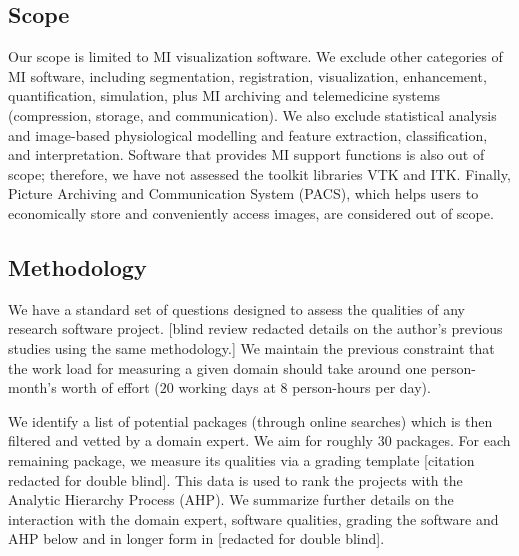\documentclass[doubleblind,12pt, 3p, times]{elsarticle}
\begin{document}
\subsection{Scope} \label{sec_scope}

Our scope is limited to MI visualization software.  We exclude other categories
of MI software, including segmentation, registration, visualization,
enhancement, quantification, simulation, plus MI archiving and telemedicine
systems (compression, storage, and communication).  We also exclude statistical
analysis and image-based physiological modelling and feature extraction,
classification, and interpretation. Software that provides MI support functions
is also out of scope; therefore, we have not assessed the toolkit libraries VTK
and ITK.  Finally, Picture Archiving and Communication System (PACS), which
helps users to economically store and conveniently access images, are considered
out of scope. 

\subsection{Methodology} \label{SecMethodology}

We have a standard set of questions designed to assess the qualities of any
research software project.  [blind review redacted details on the author's
previous studies using the same methodology.]
We maintain the previous constraint that the work load for measuring a given
domain should take around one person-month's worth of effort ($20$ working days
at $8$ person-hours per day).

We identify a list of potential packages (through online searches) which is then
filtered and vetted by a domain expert. We aim for roughly $30$ packages. For
each remaining package, we measure its qualities via a grading
template [citation redacted for double blind]. %
This data is used to rank the projects with the
Analytic Hierarchy Process (AHP).  We summarize further details on the
interaction with the domain expert, software qualities, grading the software and
AHP below and in longer form in [redacted for double blind].
\end{document}
